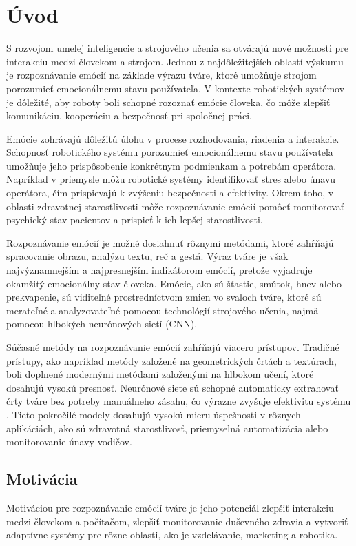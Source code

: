 \section{Úvod}
S rozvojom umelej inteligencie a strojového učenia sa otvárajú nové možnosti pre interakciu medzi človekom a strojom. Jednou z najdôležitejších oblastí výskumu je rozpoznávanie emócií na základe výrazu tváre, ktoré umožňuje strojom porozumieť emocionálnemu stavu používateľa. V kontexte robotických systémov je dôležité, aby roboty boli schopné rozoznať emócie človeka, čo môže zlepšiť komunikáciu, kooperáciu a bezpečnosť pri spoločnej práci. \cite{SAXENA202239}

Emócie zohrávajú dôležitú úlohu v procese rozhodovania, riadenia a interakcie. Schopnosť robotického systému porozumieť emocionálnemu stavu používateľa umožňuje jeho prispôsobenie konkrétnym podmienkam a potrebám operátora. Napríklad v priemysle môžu robotické systémy identifikovať stres alebo únavu operátora, čím prispievajú k zvýšeniu bezpečnosti a efektivity​. Okrem toho, v oblasti zdravotnej starostlivosti môže rozpoznávanie emócií pomôcť monitorovať psychický stav pacientov a prispieť k ich lepšej starostlivosti​. \cite{9674818} \cite{8718656} 

Rozpoznávanie emócií je možné dosiahnuť rôznymi metódami, ktoré zahŕňajú spracovanie obrazu, analýzu textu, reč a gestá​. Výraz tváre je však najvýznamnejším a najpresnejším indikátorom emócií, pretože vyjadruje okamžitý emocionálny stav človeka. Emócie, ako sú šťastie, smútok, hnev alebo prekvapenie, sú viditeľné prostredníctvom zmien vo svaloch tváre, ktoré sú merateľné a analyzovateľné pomocou technológií strojového učenia, najmä pomocou hlbokých neurónových sietí (CNN).\cite{SAXENA202239}

Súčasné metódy na rozpoznávanie emócií zahŕňajú viacero prístupov. Tradičné prístupy, ako napríklad metódy založené na geometrických črtách a textúrach, boli doplnené modernými metódami založenými na hlbokom učení, ktoré dosahujú vysokú presnosť. Neurónové siete sú schopné automaticky extrahovať črty tváre bez potreby manuálneho zásahu, čo výrazne zvyšuje efektivitu systému​. Tieto pokročilé modely dosahujú vysokú mieru úspešnosti v rôznych aplikáciách, ako sú zdravotná starostlivosť, priemyselná automatizácia alebo monitorovanie únavy vodičov​. \cite{9674818} \cite{Martinez2016}

\subsection{Motivácia}
Motiváciou pre rozpoznávanie emócií tváre je jeho potenciál zlepšiť interakciu medzi človekom a počítačom, zlepšiť monitorovanie duševného zdravia a vytvoriť adaptívne systémy pre rôzne oblasti, ako je vzdelávanie, marketing a robotika. \cite{CANAL2022593}

